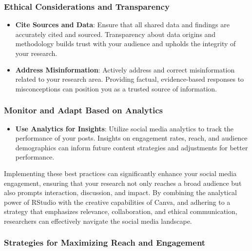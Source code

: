 \documentclass[
]{book}
\providecommand{\tightlist}{%
  \setlength{\itemsep}{0pt}\setlength{\parskip}{0pt}}
\begin{document}
\hypertarget{ethical-considerations-and-transparency}{%
\subsubsection*{Ethical Considerations and Transparency}\label{ethical-considerations-and-transparency}}

\begin{itemize}
\item
  \textbf{Cite Sources and Data}: Ensure that all shared data and findings are accurately cited and sourced. Transparency about data origins and methodology builds trust with your audience and upholds the integrity of your research.
\item
  \textbf{Address Misinformation}: Actively address and correct misinformation related to your research area. Providing factual, evidence-based responses to misconceptions can position you as a trusted source of information.
\end{itemize}

\hypertarget{monitor-and-adapt-based-on-analytics}{%
\subsubsection*{Monitor and Adapt Based on Analytics}\label{monitor-and-adapt-based-on-analytics}}

\begin{itemize}
\tightlist
\item
  \textbf{Use Analytics for Insights}: Utilize social media analytics to track the performance of your posts. Insights on engagement rates, reach, and audience demographics can inform future content strategies and adjustments for better performance.
\end{itemize}

Implementing these best practices can significantly enhance your social media engagement, ensuring that your research not only reaches a broad audience but also prompts interaction, discussion, and impact. By combining the analytical power of RStudio with the creative capabilities of Canva, and adhering to a strategy that emphasizes relevance, collaboration, and ethical communication, researchers can effectively navigate the social media landscape.

\hypertarget{strategies-for-maximizing-reach-and-engagement}{%
\subsubsection*{Strategies for Maximizing Reach and Engagement}\label{strategies-for-maximizing-reach-and-engagement}}
\end{document}
